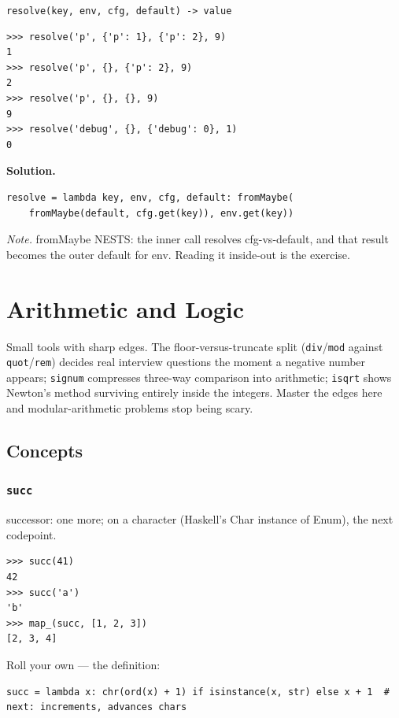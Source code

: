\documentclass[10pt,letterpaper]{book}
\begin{document}
\noindent\texttt{resolve(key, env, cfg, default) -> value}
\begin{lstlisting}[style=ex]
>>> resolve('p', {'p': 1}, {'p': 2}, 9)
1
>>> resolve('p', {}, {'p': 2}, 9)
2
>>> resolve('p', {}, {}, 9)
9
>>> resolve('debug', {}, {'debug': 0}, 1)
0
\end{lstlisting}
\noindent\textbf{Solution.}
\begin{lstlisting}[style=code]
resolve = lambda key, env, cfg, default: fromMaybe(
    fromMaybe(default, cfg.get(key)), env.get(key))
\end{lstlisting}
\noindent\textit{Note.} fromMaybe NESTS: the inner call resolves cfg-vs-default, and that result becomes the outer default for env. Reading it inside-out is the exercise.

\clearpage
\chapter{Arithmetic and Logic}

Small tools with sharp edges. The floor-versus-truncate split
(\texttt{div}/\texttt{mod} against \texttt{quot}/\texttt{rem}) decides real
interview questions the moment a negative number appears; \texttt{signum}
compresses three-way comparison into arithmetic; \texttt{isqrt} shows Newton's
method surviving entirely inside the integers. Master the edges here and
modular-arithmetic problems stop being scary.
\section{Concepts}
\subsection{\texttt{succ}}\label{def:succ}
successor: one more; on a character (Haskell's Char instance of Enum), the next codepoint.
\begin{lstlisting}[style=ex]
>>> succ(41)
42
>>> succ('a')
'b'
>>> map_(succ, [1, 2, 3])
[2, 3, 4]
\end{lstlisting}

Roll your own --- the definition:

\begin{lstlisting}[style=ex]
succ = lambda x: chr(ord(x) + 1) if isinstance(x, str) else x + 1  # next: increments, advances chars
\end{lstlisting}
\end{document}
